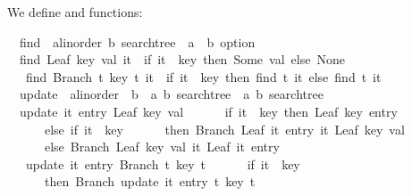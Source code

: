 \begin{isabellebody}
\begin{isamarkuptext}
  We define  and  functions:%
\end{isamarkuptext}%
\isamarkuptrue%
\isamarkupfalse%
\isanewline
\ \ find\ {\isacharcolon}{\isacharcolon}\ {\isachardoublequoteopen}{\isacharparenleft}{\isacharprime}a{\isasymColon}linorder{\isacharcomma}\ {\isacharprime}b{\isacharparenright}\ searchtree\ {\isasymRightarrow}\ {\isacharprime}a\ {\isasymRightarrow}\ {\isacharprime}b\ option{\isachardoublequoteclose}\ \isanewline
\ \ {\isachardoublequoteopen}find\ {\isacharparenleft}Leaf\ key\ val{\isacharparenright}\ it\ {\isacharequal}\ {\isacharparenleft}if\ it\ {\isacharequal}\ key\ then\ Some\ val\ else\ None{\isacharparenright}{\isachardoublequoteclose}\isanewline
\ \ {\isacharbar}\ {\isachardoublequoteopen}find\ {\isacharparenleft}Branch\ t{}\ key\ t{}{\isacharparenright}\ it\ {\isacharequal}\ {\isacharparenleft}if\ it\ {\isasymle}\ key\ then\ find\ t{}\ it\ else\ find\ t{}\ it{\isacharparenright}{\isachardoublequoteclose}\isanewline
\isanewline
{}\isamarkupfalse%
\isanewline
\ \ update\ {\isacharcolon}{\isacharcolon}\ {\isachardoublequoteopen}{\isacharprime}a{\isasymColon}linorder\ {\isasymtimes}\ {\isacharprime}b\ {\isasymRightarrow}\ {\isacharparenleft}{\isacharprime}a{\isacharcomma}\ {\isacharprime}b{\isacharparenright}\ searchtree\ {\isasymRightarrow}\ {\isacharparenleft}{\isacharprime}a{\isacharcomma}\ {\isacharprime}b{\isacharparenright}\ searchtree{\isachardoublequoteclose}\ \isanewline
\ \ {\isachardoublequoteopen}update\ {\isacharparenleft}it{\isacharcomma}\ entry{\isacharparenright}\ {\isacharparenleft}Leaf\ key\ val{\isacharparenright}\ {\isacharequal}\ {\isacharparenleft}\isanewline
\ \ \ \ if\ it\ {\isacharequal}\ key\ then\ Leaf\ key\ entry\isanewline
\ \ \ \ \ \ else\ if\ it\ {\isasymle}\ key\isanewline
\ \ \ \ \ \ then\ Branch\ {\isacharparenleft}Leaf\ it\ entry{\isacharparenright}\ it\ {\isacharparenleft}Leaf\ key\ val{\isacharparenright}\isanewline
\ \ \ \ \ \ else\ Branch\ {\isacharparenleft}Leaf\ key\ val{\isacharparenright}\ it\ {\isacharparenleft}Leaf\ it\ entry{\isacharparenright}\isanewline
\ \ \ {\isacharparenright}{\isachardoublequoteclose}\isanewline
\ \ {\isacharbar}\ {\isachardoublequoteopen}update\ {\isacharparenleft}it{\isacharcomma}\ entry{\isacharparenright}\ {\isacharparenleft}Branch\ t{}\ key\ t{}{\isacharparenright}\ {\isacharequal}\ {\isacharparenleft}\isanewline
\ \ \ \ if\ it\ {\isasymle}\ key\isanewline
\ \ \ \ \ \ then\ {\isacharparenleft}Branch\ {\isacharparenleft}update\ {\isacharparenleft}it{\isacharcomma}\ entry{\isacharparenright}\ t{}{\isacharparenright}\ key\ t{}{\isacharparenright}\isanewline

\end{isabellebody}
